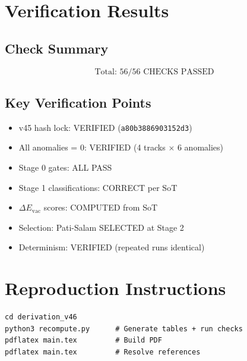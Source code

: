 \documentclass[11pt,a4paper]{article}
\begin{document}
\section{Verification Results}
\label{sec:verification}

\subsection{Check Summary}
\label{subsec:check-summary}

\begin{equation}
\label{eq:check-summary}
\boxed{\text{Total: } 56/56 \text{ CHECKS PASSED}}
\end{equation}

\subsection{Key Verification Points}
\label{subsec:key-verification}

\begin{itemize}
\item v45 hash lock: VERIFIED (\texttt{a80b3886903152d3})
\item All anomalies = 0: VERIFIED (4 tracks $\times$ 6 anomalies)
\item Stage 0 gates: ALL PASS
\item Stage 1 classifications: CORRECT per SoT
\item $\Delta E_{\text{vac}}$ scores: COMPUTED from SoT
\item Selection: Pati-Salam SELECTED at Stage 2
\item Determinism: VERIFIED (repeated runs identical)
\end{itemize}

\section{Reproduction Instructions}
\label{sec:reproduction}

\begin{verbatim}
cd derivation_v46
python3 recompute.py      # Generate tables + run checks
pdflatex main.tex         # Build PDF
pdflatex main.tex         # Resolve references
\end{verbatim}
\end{document}
